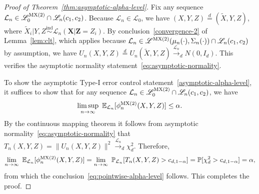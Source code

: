 \documentclass[12pt]{article}
\theoremstyle{definition}
\theoremstyle{remark}
\newcommand{\prx}{\bm X}
\newcommand{\srx}{X}
\newcommand{\prz}{\bm Z}
\newcommand{\srz}{Z}
\newcommand{\srxk}{\widetilde X}
\newcommand{\sry}{Y}
\begin{document}
\begin{proof}[Proof of Theorem~\ref{thm:asymptotic-alpha-level}]

Fix any sequence $\mathcal L_n \in \mathscr L_0^{\textnormal{MX(2)}}\cap \mathscr L_n(c_1, c_2)$. Because $\mathcal L_n \in \mathscr L_0$, we have $(\srx, \sry, \srz) \overset d = (\srxk, \sry, \srz)$, where $\srxk_i|\sry,\srz \overset{\text{ind}}\sim \mathcal L_n(\prx|\prz = \srz_i)$. By conclusion~\eqref{convergence-2} of Lemma~\ref{lem:clt}, which applies because $\mathcal L_n \in \mathscr L^{\textnormal{MX(2)}}(\mu_n(\cdot), \Sigma_n(\cdot)) \cap \mathscr L_n(c_1, c_2)$ by assumption, we have $U_n(\srx, \sry,\srz) \overset d = U_n(\srxk, \sry,\srz) \overset{\mathcal L_n}\rightarrow_d N(0, I_d)$. This verifies the asymptotic normality statement~\eqref{eq:asymptotic-normality}.

To show the asymptotic Type-I error control statement~\eqref{asymptotic-alpha-level}, it suffices to show that for any sequence $\mathcal L_n \in \mathscr L_0^{\textnormal{MX(2)}}\cap \mathscr L_n(c_1, c_2)$, we have
	\begin{equation}
		\limsup_{n \rightarrow \infty}\ \mathbb E_{\mathcal L_n}[\phi^{\textnormal{MX(2)}}_n(\srx, \sry, \srz)] \leq \alpha.
	\label{eq:pointwise-alpha-level}
	\end{equation}
By the continuous mapping theorem it follows from asymptotic normality~\eqref{eq:asymptotic-normality} that $T_n(\srx,\sry,\srz) = \|U_n(\srx, \sry,\srz)\|^2 \overset{\mathcal L_n}\rightarrow_d \chi^2_d$. Therefore,
	\begin{equation*}
		\lim_{n \rightarrow \infty}\ \mathbb E_{\mathcal L_n}[\phi^{\textnormal{MX(2)}}_n(\srx, \sry, \srz)] = \lim_{n \rightarrow \infty}\ \mathbb P_{\mathcal L_n}[T_n(\srx,\sry,\srz) > c_{d,1-\alpha}] = \mathbb P[\chi^2_d > c_{d,1-\alpha}] = \alpha,
	\end{equation*}
	from which the conclusion~\eqref{eq:pointwise-alpha-level} follows. This completes the proof.
\end{proof}
\end{document}
